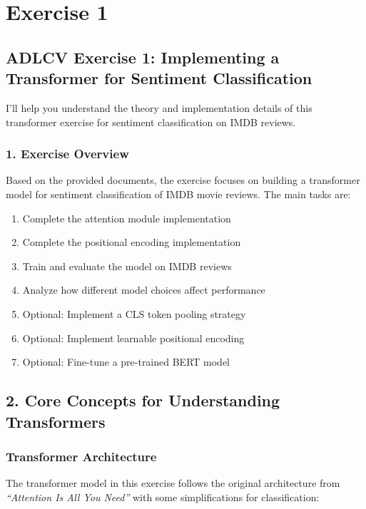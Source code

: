 \chapter{\normalsize Exercise 1}

\section*{ADLCV Exercise 1: Implementing a Transformer for Sentiment Classification}

I'll help you understand the theory and implementation details of this transformer exercise for sentiment classification on IMDB reviews.

\subsection*{1. Exercise Overview}

Based on the provided documents, the exercise focuses on building a transformer model for sentiment classification of IMDB movie reviews. The main tasks are:

\begin{enumerate}
    \item Complete the attention module implementation
    \item Complete the positional encoding implementation
    \item Train and evaluate the model on IMDB reviews
    \item Analyze how different model choices affect performance
    \item Optional: Implement a CLS token pooling strategy
    \item Optional: Implement learnable positional encoding
    \item Optional: Fine-tune a pre-trained BERT model
\end{enumerate}

\section*{2. Core Concepts for Understanding Transformers}

\subsection*{Transformer Architecture}
The transformer model in this exercise follows the original architecture from \emph{``Attention Is All You Need''} with some simplifications for classification:

